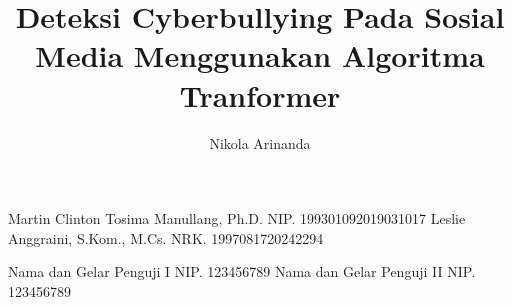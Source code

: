 \documentclass[12pt, a4paper, onecolumn, oneside, final]{report}
\begin{document}

    
    \title{Deteksi Cyberbullying Pada Sosial Media Menggunakan Algoritma Tranformer} 	
    
    \author{Nikola Arinanda}		%
	
	\dosbingA%
		{Martin Clinton Tosima Manullang, Ph.D. }%
		{NIP. 199301092019031017 }				%
	\dosbingB%
		{Leslie Anggraini, S.Kom., M.Cs.}%
		{NRK. 1997081720242294 }				%
		
	\pengujiA%
		{Nama dan Gelar Penguji I}%
		{NIP. 123456789}				%
	\pengujiB%
		{Nama dan Gelar Penguji II}%
		{NIP. 123456789}				%

	\sloppy %
    \setcounter{page}{1} %

    
%    
%    

    \tableofcontents
    \pagebreak
    \listoftables
    \pagebreak
    \listoffigures
    \pagebreak
    \listofmyequations
    \pagebreak
%    
\end{document}
